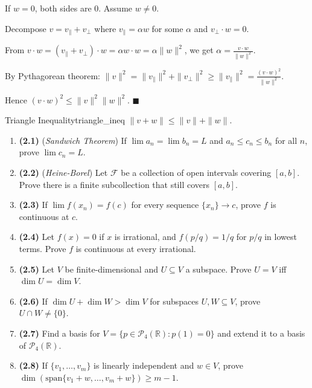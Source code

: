 \documentclass[11pt, letterpaper, openany]{book}
\renewenvironment{proof}[1][\proofname]{%
  \tcolorbox[blanker, breakable, left=1em,
    before skip=1em, after skip=1em,
    borderline west={2pt}{0pt}{MagicTeal!50},
    colback=MagicCream,
    before upper={\textcolor{MagicTeal}{\sffamily\bfseries #1.}\space}
  ]%
}{%
  \hfill\textcolor{MagicTeal}{\ensuremath{\blacksquare}}\endtcolorbox%
}
\newcounter{exercise}[chapter]
\begin{document}
\begin{proof}
If $w = 0$, both sides are 0. Assume $w \neq 0$.

Decompose $v = v_\parallel + v_\perp$ where $v_\parallel = \alpha w$ for some $\alpha$ and $v_\perp \cdot w = 0$.

From $v \cdot w = (v_\parallel + v_\perp) \cdot w = \alpha w \cdot w = \alpha \|w\|^2$, we get $\alpha = \frac{v \cdot w}{\|w\|^2}$.

By Pythagorean theorem: $\|v\|^2 = \|v_\parallel\|^2 + \|v_\perp\|^2 \geq \|v_\parallel\|^2 = \frac{(v \cdot w)^2}{\|w\|^2}$.

Hence $(v \cdot w)^2 \leq \|v\|^2 \|w\|^2$.
\end{proof}

\begin{thm}{Triangle Inequality}{triangle_ineq}
$\|v + w\| \leq \|v\| + \|w\|$.
\end{thm}

\begin{exercises}
\begin{enumerate}
    \item \textbf{(2.1)} (\textit{Sandwich Theorem}) If $\lim a_n = \lim b_n = L$ and $a_n \leq c_n \leq b_n$ for all $n$, prove $\lim c_n = L$.
    
    \item \textbf{(2.2)} (\textit{Heine-Borel}) Let $\mathcal{F}$ be a collection of open intervals covering $[a,b]$. Prove there is a finite subcollection that still covers $[a,b]$.
    
    \item \textbf{(2.3)} If $\lim f(x_n) = f(c)$ for every sequence $\{x_n\} \to c$, prove $f$ is continuous at $c$.
    
    \item \textbf{(2.4)} Let $f(x) = 0$ if $x$ is irrational, and $f(p/q) = 1/q$ for $p/q$ in lowest terms. Prove $f$ is continuous at every irrational.
    
    \item \textbf{(2.5)} Let $V$ be finite-dimensional and $U \subseteq V$ a subspace. Prove $U = V$ iff $\dim U = \dim V$.
    
    \item \textbf{(2.6)} If $\dim U + \dim W > \dim V$ for subspaces $U, W \subseteq V$, prove $U \cap W \neq \{0\}$.
    
    \item \textbf{(2.7)} Find a basis for $V = \{p \in \mathcal{P}_4(\mathbb{R}) : p(1) = 0\}$ and extend it to a basis of $\mathcal{P}_4(\mathbb{R})$.
    
    \item \textbf{(2.8)} If $\{v_1, \ldots, v_m\}$ is linearly independent and $w \in V$, prove $\dim(\text{span}\{v_1+w, \ldots, v_m+w\}) \geq m-1$.
\end{enumerate}
\end{exercises}
\end{document}
